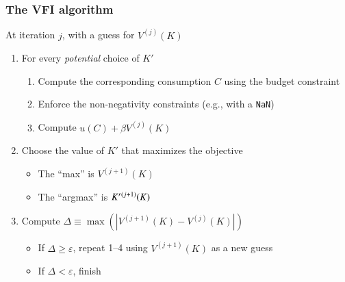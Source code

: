 \documentclass[10pt, aspectratio=1610, handout]{beamer}
\begin{document}
  \begin{frame}
    \frametitle{The VFI algorithm} \label{sld:vfi_algo}

    At iteration $j$, with a guess for $V^{(j)}(K)$

    \vfill\pause

    \begin{enumerate}
      \item For every \textit{potential} choice of $K'$
        \begin{enumerate}
          \item Compute the corresponding consumption $C$ using the budget constraint
          \item Enforce the non-negativity constraints (e.g., with a \texttt{NaN})
          \item Compute $u(C) + \beta V^{(j)}(K)$
        \end{enumerate}
      \vfill\pause
      \item Choose the value of $K'$ that maximizes the objective
        \begin{itemize}
          \item The ``max'' is $V^{(j+1)}(K)$
          \item The ``argmax'' is $K'\vphantom{K}^{(j+1)}(K)$
        \end{itemize}
      \vfill\pause
      \item Compute $\Delta \equiv \max \left( \left| V^{(j+1)}(K) - V^{(j)}(K) \right| \right)$
        \begin{itemize}
          \item If $\Delta \geq \varepsilon$, repeat 1--4 using $V^{(j+1)}(K)$ as a new guess
          \item If $\Delta < \varepsilon$, finish
        \end{itemize}
    \end{enumerate}

    \vfill

    \hfill{}

  \end{frame}
\end{document}
